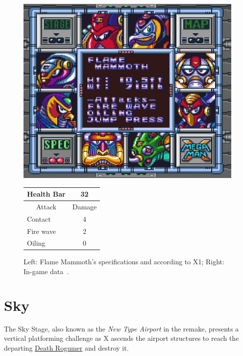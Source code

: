 \begin{figure}[htp]
	\begin{minipage}[c]{0.45\linewidth}
		\vspace{0pt}
		\centering
		\includegraphics[width=\linewidth]{figures/X1/Flame_mammoth/Flame_mammoth_specs.jpg}
	\end{minipage}
	\begin{minipage}[c]{0.45\linewidth}
		\centering
		\vspace{0pt}
		\begin{tabular}[h]{l c}
			\toprule
			Health Bar & 32\\
			\midrule
			\multicolumn{1}{c}{Attack} & \multicolumn{1}{c}{Damage}\\
			Contact & 4\\
			Fire wave& 2\\
			Oiling & 0\\
			\bottomrule
		\end{tabular}
	\end{minipage}
	\caption{Left: Flame Mammoth's specifications and according to X1; Right: In-game data~\cite{wiki:Flame_mammoth}. }
	\label{Mammoth_specs}
\end{figure}

\section{Sky}
The Sky Stage, also known as the \textit{New Type Airport} in the remake, presents a vertical platforming challenge as X ascends the airport structures to reach the departing \hyperlink{vehicle:Death_Rogumer}{Death Rogumer} and destroy it.

